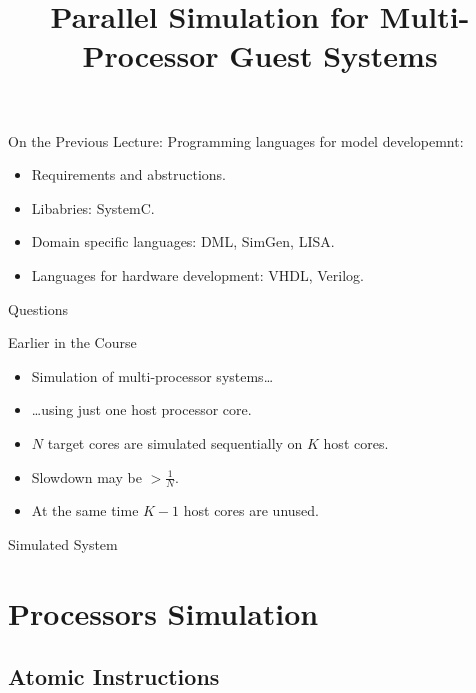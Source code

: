 

\title{Parallel Simulation for Multi-Processor Guest Systems}



\startslides

\begin{frame}{On the Previous Lecture:}
  Programming languages for model developemnt:
  \begin{itemize}
    \item Requirements and abstructions.
    \item Libabries: SystemC.
    \item Domain specific languages: DML, SimGen, LISA.
    \item Languages for hardware development: VHDL, Verilog.
  \end{itemize}
\end{frame}

\begin{frame}{Questions}
\end{frame}

\begin{frame}{Earlier in the Course}
  \begin{itemize}
   \item Simulation of multi-processor systems\dots\pause
   \item \dots using just one host processor core.
   \vfill
   \item $N$ target cores are simulated sequentially on $K$ host cores.
   \item Slowdown may be $> \frac{1}{N}$.
   \item At the same time $K-1$ host cores are unused.
  \end{itemize}
\end{frame}

\begin{frame}{Simulated System}
  \centering
\end{frame}

\section{Processors Simulation}

\subsection{Atomic Instructions}

